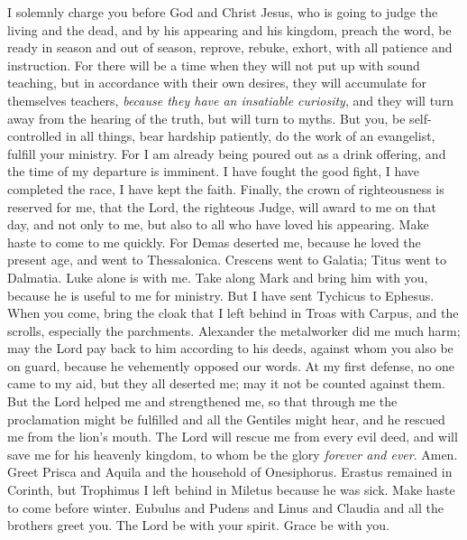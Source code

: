 \begin{biblechapter} %
 I solemnly charge you before God and Christ Jesus, who is going to judge the living and the dead, and by his appearing and his kingdom,
\verse preach the word, be ready in season and out of season, reprove, rebuke, exhort, with all patience and instruction.
\verse For there will be a time when they will not put up with sound teaching, but in accordance with their own desires, they will accumulate for themselves teachers, \textit{because they have an insatiable curiosity},
\verse and they will turn away from the hearing of the truth, but will turn to myths.
\verse But you, be self-controlled in all things, bear hardship patiently, do the work of an evangelist, fulfill your ministry.
\verse For I am already being poured out as a drink offering, and the time of my departure is imminent.
\verse I have fought the good fight, I have completed the race, I have kept the faith.
\verse Finally, the crown of righteousness is reserved for me, that the Lord, the righteous Judge, will award to me on that day, and not only to me, but also to all who have loved his appearing.
 Make haste to come to me quickly.
\verse For Demas deserted me, because he loved the present age, and went to Thessalonica. Crescens went to Galatia; Titus went to Dalmatia.
\verse Luke alone is with me. Take along Mark and bring him with you, because he is useful to me for ministry.
\verse But I have sent Tychicus to Ephesus.
\verse When you come, bring the cloak that I left behind in Troas with Carpus, and the scrolls, especially the parchments.
\verse Alexander the metalworker did me much harm; may the Lord pay back to him according to his deeds,
\verse against whom you also be on guard, because he vehemently opposed our words.
\verse At my first defense, no one came to my aid, but they all deserted me; may it not be counted against them.
\verse But the Lord helped me and strengthened me, so that through me the proclamation might be fulfilled and all the Gentiles might hear, and he rescued me from the lion’s mouth.
\verse The Lord will rescue me from every evil deed, and will save me for his heavenly kingdom, to whom be the glory \textit{forever and ever}. Amen.
 Greet Prisca and Aquila and the household of Onesiphorus.
\verse Erastus remained in Corinth, but Trophimus I left behind in Miletus because he was sick.
\verse Make haste to come before winter. Eubulus and Pudens and Linus and Claudia and all the brothers greet you.
\verse The Lord be with your spirit. Grace be with you.
\end{biblechapter}

